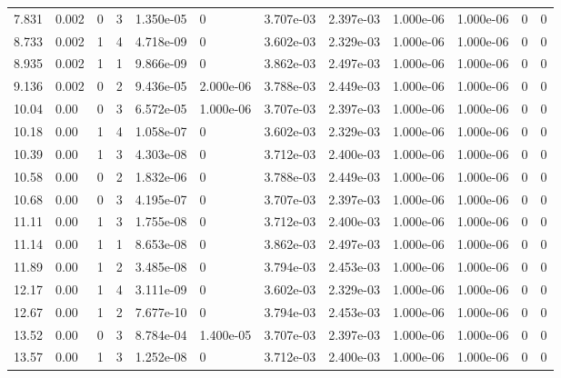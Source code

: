 \documentclass[preview]{standalone}
\begin{document}
{{\begin{tabular}{L{1.2cm}C{1.2cm} C{0.3cm}C{0.5cm} C{1.4cm}C{1.4cm} C{1.4cm}C{1.4cm} C{1.6cm}C{1.6cm} C{1.6cm}C{1.6cm}}
  7.831  &  0.002  & 0     &  3 &  1.350e-05  & 0  &  3.707e-03&   2.397e-03& 1.000e-06 & 1.000e-06   &  0 & 0  \\ 
  8.733  &  0.002  & 1     &  4 &  4.718e-09  & 0  &  3.602e-03&   2.329e-03& 1.000e-06 & 1.000e-06   &  0 & 0  \\ 
  8.935  &  0.002  & 1     &  1 &  9.866e-09  & 0  &  3.862e-03&   2.497e-03& 1.000e-06 & 1.000e-06   &  0 & 0  \\ 
  9.136  &  0.002  & 0     &  2 &  9.436e-05  & 2.000e-06  &  3.788e-03&   2.449e-03& 1.000e-06 & 1.000e-06   &  0 & 0  \\ 
  10.04  &  0.00  & 0     &  3 &  6.572e-05  & 1.000e-06  &  3.707e-03&   2.397e-03& 1.000e-06 & 1.000e-06   &  0 & 0  \\ 
  10.18  &  0.00  & 1     &  4 &  1.058e-07  & 0  &  3.602e-03&   2.329e-03& 1.000e-06 & 1.000e-06   &  0 & 0  \\ 
  10.39  &  0.00  & 1     &  3 &  4.303e-08  & 0  &  3.712e-03&   2.400e-03& 1.000e-06 & 1.000e-06   &  0 & 0  \\ 
  10.58  &  0.00  & 0     &  2 &  1.832e-06  & 0  &  3.788e-03&   2.449e-03& 1.000e-06 & 1.000e-06   &  0 & 0  \\ 
  10.68  &  0.00  & 0     &  3 &  4.195e-07  & 0  &  3.707e-03&   2.397e-03& 1.000e-06 & 1.000e-06   &  0 & 0  \\ 
  11.11  &  0.00  & 1     &  3 &  1.755e-08  & 0  &  3.712e-03&   2.400e-03& 1.000e-06 & 1.000e-06   &  0 & 0  \\ 
  11.14  &  0.00  & 1     &  1 &  8.653e-08  & 0  &  3.862e-03&   2.497e-03& 1.000e-06 & 1.000e-06   &  0 & 0  \\ 
  11.89  &  0.00  & 1     &  2 &  3.485e-08  & 0  &  3.794e-03&   2.453e-03& 1.000e-06 & 1.000e-06   &  0 & 0  \\ 
  12.17  &  0.00  & 1     &  4 &  3.111e-09  & 0  &  3.602e-03&   2.329e-03& 1.000e-06 & 1.000e-06   &  0 & 0  \\ 
  12.67  &  0.00  & 1     &  2 &  7.677e-10  & 0  &  3.794e-03&   2.453e-03& 1.000e-06 & 1.000e-06   &  0 & 0  \\ 
  13.52  &  0.00  & 0     &  3 &  8.784e-04  & 1.400e-05  &  3.707e-03&   2.397e-03& 1.000e-06 & 1.000e-06   &  0 & 0  \\ 
  13.57  &  0.00  & 1     &  3 &  1.252e-08  & 0  &  3.712e-03&   2.400e-03& 1.000e-06 & 1.000e-06   &  0 & 0  \\ 
\hline 
\end{tabular} 

}}
\end{document}

